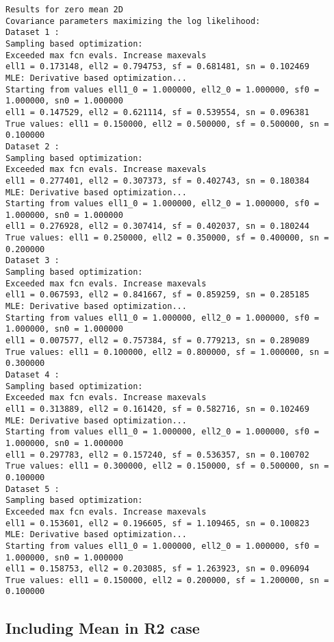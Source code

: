         \color{lightgray} \begin{verbatim}
Results for zero mean 2D
Covariance parameters maximizing the log likelihood:
Dataset 1 : 
Sampling based optimization:
Exceeded max fcn evals. Increase maxevals
ell1 = 0.173148, ell2 = 0.794753, sf = 0.681481, sn = 0.102469 
MLE: Derivative based optimization...
Starting from values ell1_0 = 1.000000, ell2_0 = 1.000000, sf0 = 1.000000, sn0 = 1.000000 
ell1 = 0.147529, ell2 = 0.621114, sf = 0.539554, sn = 0.096381 
True values: ell1 = 0.150000, ell2 = 0.500000, sf = 0.500000, sn = 0.100000 
Dataset 2 : 
Sampling based optimization:
Exceeded max fcn evals. Increase maxevals
ell1 = 0.277401, ell2 = 0.307373, sf = 0.402743, sn = 0.180384 
MLE: Derivative based optimization...
Starting from values ell1_0 = 1.000000, ell2_0 = 1.000000, sf0 = 1.000000, sn0 = 1.000000 
ell1 = 0.276928, ell2 = 0.307414, sf = 0.402037, sn = 0.180244 
True values: ell1 = 0.250000, ell2 = 0.350000, sf = 0.400000, sn = 0.200000 
Dataset 3 : 
Sampling based optimization:
Exceeded max fcn evals. Increase maxevals
ell1 = 0.067593, ell2 = 0.841667, sf = 0.859259, sn = 0.285185 
MLE: Derivative based optimization...
Starting from values ell1_0 = 1.000000, ell2_0 = 1.000000, sf0 = 1.000000, sn0 = 1.000000 
ell1 = 0.007577, ell2 = 0.757384, sf = 0.779213, sn = 0.289089 
True values: ell1 = 0.100000, ell2 = 0.800000, sf = 1.000000, sn = 0.300000 
Dataset 4 : 
Sampling based optimization:
Exceeded max fcn evals. Increase maxevals
ell1 = 0.313889, ell2 = 0.161420, sf = 0.582716, sn = 0.102469 
MLE: Derivative based optimization...
Starting from values ell1_0 = 1.000000, ell2_0 = 1.000000, sf0 = 1.000000, sn0 = 1.000000 
ell1 = 0.297783, ell2 = 0.157240, sf = 0.536357, sn = 0.100702 
True values: ell1 = 0.300000, ell2 = 0.150000, sf = 0.500000, sn = 0.100000 
Dataset 5 : 
Sampling based optimization:
Exceeded max fcn evals. Increase maxevals
ell1 = 0.153601, ell2 = 0.196605, sf = 1.109465, sn = 0.100823 
MLE: Derivative based optimization...
Starting from values ell1_0 = 1.000000, ell2_0 = 1.000000, sf0 = 1.000000, sn0 = 1.000000 
ell1 = 0.158753, ell2 = 0.203085, sf = 1.263923, sn = 0.096094 
True values: ell1 = 0.150000, ell2 = 0.200000, sf = 1.200000, sn = 0.100000 
\end{verbatim} \color{black}
    

\subsection*{Including Mean in R2 case}

